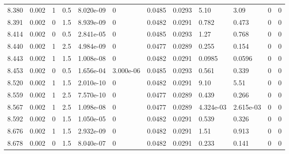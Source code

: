 \documentclass[preview]{standalone}
\begin{document}
{{{{{{\begin{tabular}{L{1.2cm}C{1.2cm} C{0.3cm}C{0.5cm} C{1.4cm}C{1.4cm} C{1.4cm}C{1.4cm} C{1.6cm}C{1.6cm} C{1.6cm}C{1.6cm}}
  8.380  &  0.002  & 1     & 0.5 &  8.020e-09  & 0  &  0.0485&   0.0293& 5.10 & 3.09   &  0 & 0  \\ 
  8.391  &  0.002  & 0     & 1.5 &  8.939e-09  & 0  &  0.0482&   0.0291& 0.782 & 0.473   &  0 & 0  \\ 
  8.414  &  0.002  & 0     & 0.5 &  2.841e-05  & 0  &  0.0485&   0.0293& 1.27 & 0.768   &  0 & 0  \\ 
  8.440  &  0.002  & 1     & 2.5 &  4.984e-09  & 0  &  0.0477&   0.0289& 0.255 & 0.154   &  0 & 0  \\ 
  8.443  &  0.002  & 1     & 1.5 &  1.008e-08  & 0  &  0.0482&   0.0291& 0.0985 & 0.0596   &  0 & 0  \\ 
  8.453  &  0.002  & 0     & 0.5 &  1.656e-04  & 3.000e-06  &  0.0485&   0.0293& 0.561 & 0.339   &  0 & 0  \\ 
  8.520  &  0.002  & 1     & 1.5 &  2.010e-10  & 0  &  0.0482&   0.0291& 9.10 & 5.51   &  0 & 0  \\ 
  8.559  &  0.002  & 1     & 2.5 &  7.570e-10  & 0  &  0.0477&   0.0289& 0.439 & 0.266   &  0 & 0  \\ 
  8.567  &  0.002  & 1     & 2.5 &  1.098e-08  & 0  &  0.0477&   0.0289& 4.324e-03 & 2.615e-03   &  0 & 0  \\ 
  8.592  &  0.002  & 0     & 1.5 &  1.050e-05  & 0  &  0.0482&   0.0291& 0.539 & 0.326   &  0 & 0  \\ 
  8.676  &  0.002  & 1     & 1.5 &  2.932e-09  & 0  &  0.0482&   0.0291& 1.51 & 0.913   &  0 & 0  \\ 
  8.678  &  0.002  & 0     & 1.5 &  8.040e-07  & 0  &  0.0482&   0.0291& 0.233 & 0.141   &  0 & 0  \\ 
\hline 
\end{tabular} 

}}}}}}
\end{document}
